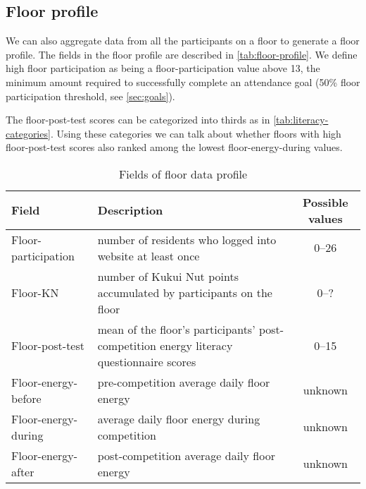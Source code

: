 \subsection{Floor profile}
\label{sec:floor-profile}

We can also aggregate data from all the participants on a floor to generate a floor profile. The fields in the floor profile are described in \autoref{tab:floor-profile}. We define high floor participation as being a floor-participation value above 13, the minimum amount required to successfully complete an attendance goal (50\% floor participation threshold, see \autoref{sec:goals}).

The floor-post-test scores can be categorized into thirds as in \autoref{tab:literacy-categories}. Using these categories we can talk about whether floors with high floor-post-test scores also ranked among the lowest floor-energy-during values.

\begin{table}[htbp]
	\centering
		\begin{tabular}{| l | p{8cm} | c |}
			\hline
			Field & Description & Possible values \\ \hline
			
			Floor-participation & number of residents who logged into website at least once & 0--26 \\ \hline
	
			Floor-KN & number of Kukui Nut points accumulated by participants on the floor & 0--? \\ \hline

			Floor-post-test & mean of the floor's participants' post-competition energy literacy questionnaire scores & 0--15 \\ \hline

			Floor-energy-before & pre-competition average daily floor energy & unknown \\ \hline

			Floor-energy-during & average daily floor energy during competition & unknown \\ \hline

			Floor-energy-after & post-competition average daily floor energy & unknown \\ \hline

		\end{tabular}
	\caption{Fields of floor data profile}
	\label{tab:floor-profile}
\end{table}

